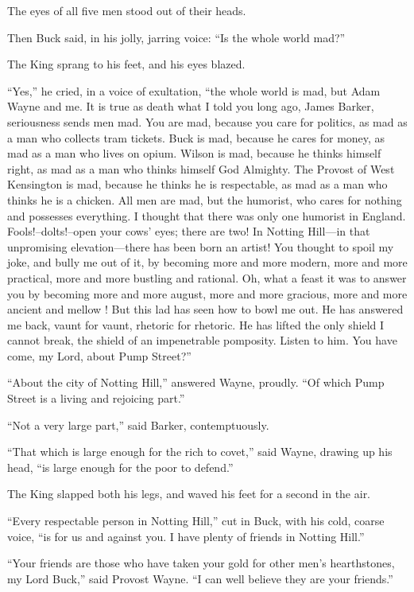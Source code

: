 \documentclass{book}
\begin{document}
The eyes of all five men stood out of their heads.

Then Buck said, in his jolly, jarring voice: “Is the whole world mad?”

The King sprang to his feet, and his eyes blazed.

“Yes,” he cried, in a voice of exultation, “the whole world is mad, but Adam Wayne and me. It is true as death what I told you long ago, James Barker, seriousness sends men mad. You are mad, because you care for politics, as mad as a man who collects tram tickets. Buck is mad, because he cares for money, as mad as a man who lives on opium. Wilson is mad, because he thinks himself right, as mad as a man who thinks himself God Almighty. The Provost of West Kensington is mad, because he thinks he is respectable, as mad as a man who thinks he is a chicken. All men are mad, but the humorist, who cares for nothing and possesses everything. I thought that there was only one humorist in England. Fools!–dolts!–open your cows’ eyes; there are two! In Notting Hill—in that unpromising elevation—there has been born an artist! You thought to spoil my joke, and bully me out of it, by becoming more and more modern, more and more practical, more and more bustling and rational. Oh, what a feast it was to answer you by becoming more and more august, more and more gracious, more and more ancient and mellow ! But this lad has seen how to bowl me out. He has answered me back, vaunt for vaunt, rhetoric for rhetoric. He has lifted the only shield I cannot break, the shield of an impenetrable pomposity. Listen to him. You have come, my Lord, about Pump Street?”

“About the city of Notting Hill,” answered Wayne, proudly. “Of which Pump Street is a living and rejoicing part.”

“Not a very large part,” said Barker, contemptuously.

“That which is large enough for the rich to covet,” said Wayne, drawing up his head, “is large enough for the poor to defend.”

The King slapped both his legs, and waved his feet for a second in the air.

“Every respectable person in Notting Hill,” cut in Buck, with his cold, coarse voice, “is for us and against you. I have plenty of friends in Notting Hill.”

“Your friends are those who have taken your gold for other men’s hearthstones, my Lord Buck,” said Provost Wayne. “I can well believe they are your friends.”
\end{document}
